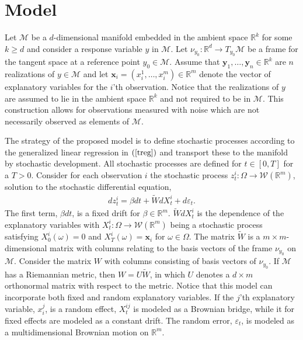 \documentclass[runningheads,a4paper]{llncs}
\newcommand{\R}{\mathbb R}
\newcommand{\M}{\mathcal{M}}
\begin{document}
\section{Model}
\label{sec::Mod}

Let $\M$ be a $d$-dimensional manifold embedded in the ambient space $\R^k$ for some $k\geq d$ and consider a response variable $y$ in $\M$. Let $\nu_{y_0}\colon\R^d\to T_{y_0}\M$ be a frame for the tangent space at a reference point $y_0\in\M$. Assume that $\boldsymbol{y}_1,\ldots,\boldsymbol{y}_n\in\R^{k}$ are $n$ realizations of $y\in\M$ and let $\boldsymbol{x}_i = (x^1_i,\ldots,x^m_i)\in\R^{m}$ denote the vector of explanatory variables for the $i$'th observation. Notice that the realizations of $y$ are assumed to lie in the ambient space $\R^k$ and not required to be in $\M$. This construction allows for observations measured with noise which are not necessarily observed as elements of $\M$.

The strategy of the proposed model is to define stochastic processes according to the generalized linear regression in $(\ref{treg})$ and transport these to the manifold by stochastic development. All stochastic processes are defined for $t\in [0,T]$ for a $T > 0$. Consider for each observation $i$ the stochastic process $z_t^{i}\colon\Omega\to\mathcal{W}(\R^m)$, solution to the stochastic differential equation,
\begin{align}
    dz^i_t = \beta dt + \tilde{W} dX^i_t + d\varepsilon_t.
\label{eq:paths}
\end{align}
The first term, $\beta dt$, is a fixed drift for $\beta\in\R^m$. $\tilde{W} dX_t^i$ is the dependence of the explanatory variables with $X_t^{i}\colon\Omega\to\mathcal{W}(\R^m)$ being a stochastic process satisfying $X_0^{i}(\omega) = 0$ and $X_{T}^{i}(\omega) = \boldsymbol{x}_i$ for $\omega\in\Omega$. The matrix $\tilde{W}$ is a $m\times m$-dimensional matrix with columns relating to the basis vectors of the frame $\nu_{y_0}$ on $\M$. Consider the matrix $W$ with columns consisting of basis vectors of $\nu_{y_0}$. If $\M$ has a Riemannian metric, then $W = U\tilde{W}$, in which $U$ denotes a $d\times m$ orthonormal matrix with respect to the metric.
Notice that this model can incorporate both fixed and random explanatory variables. If the $j$'th explanatory variable, $x_i^j$, is a random effect, $X_t^{ij}$ is modeled as a Brownian bridge, while it for fixed effects are modeled as a constant drift. The random error, $\varepsilon_t$, is modeled as a multidimensional Brownian motion on $\R^m$. 
\end{document}
